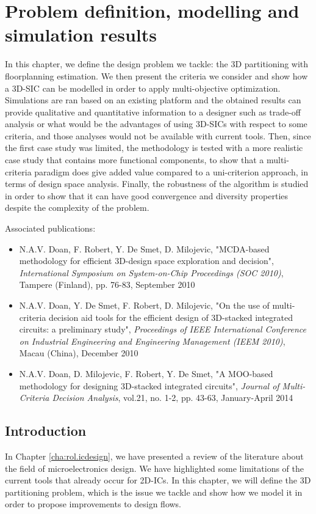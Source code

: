 \chapter{Problem definition, modelling and simulation results}
\label{cha:model}

\begin{summary}
In this chapter, we define the design problem we tackle: the 3D partitioning with floorplanning estimation. We then present the criteria we consider and show how a 3D-SIC can be modelled in order to apply multi-objective optimization. Simulations are ran based on an existing platform and the obtained results can provide qualitative and quantitative information to a designer such as trade-off analysis or what would be the advantages of using 3D-SICs with respect to some criteria, and those analyses would not be available with current tools. Then, since the first case study was limited, the methodology is tested with a more realistic case study that contains more functional components, to show that a multi-criteria paradigm does give added value compared to a uni-criterion approach, in terms of design space analysis. Finally, the robustness of the algorithm is studied in order to show that it can have good convergence and diversity properties despite the complexity of the problem.
\end{summary}

Associated publications:
\begin{itemize}
\item N.A.V. Doan, F. Robert, Y. De Smet, D. Milojevic, "MCDA-based methodology for efficient 3D-design space exploration and decision", \textit{International Symposium on System-on-Chip Proceedings (SOC 2010)}, Tampere (Finland), pp. 76-83, September 2010
\item N.A.V. Doan, Y. De Smet, F. Robert, D. Milojevic, "On the use of multi-criteria decision aid tools for the efficient design of 3D-stacked integrated circuits: a preliminary study", \textit{Proceedings of IEEE International Conference on Industrial Engineering and Engineering Management (IEEM 2010)}, Macau (China), December 2010
\item N.A.V. Doan, D. Milojevic, F. Robert, Y. De Smet, "A MOO-based methodology for designing 3D-stacked integrated circuits", \textit{Journal of Multi-Criteria Decision Analysis}, vol.21, no. 1-2, pp. 43-63, January-April 2014
\end{itemize}

\section{Introduction}
In Chapter \ref{cha:rol.icdesign}, we have presented a review of the literature about the field of microelectronics design. We have highlighted some limitations of the current tools that already occur for 2D-ICs. In this chapter, we will define the 3D partitioning problem, which is the issue we tackle and show how we model it in order to propose improvements to design flows.

